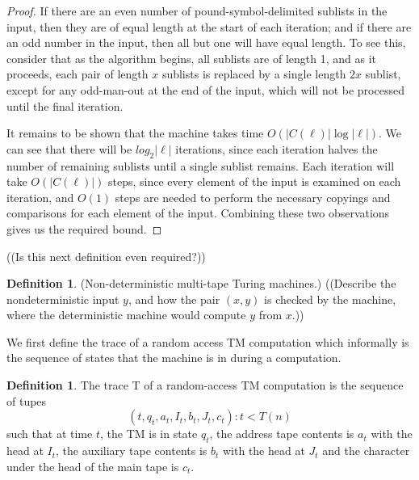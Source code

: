 \documentclass[english]{article}
\theoremstyle{plain}
\theoremstyle{definition}
\newtheorem{defn}[thm]{Definition}
\theoremstyle{plain}
\begin{document}
\begin{proof}
  If there are an even number of pound-symbol-delimited sublists in
  the input, then they are of equal length at the start of each
  iteration; and if there are an odd number in the input, then all but
  one will have equal length. To see this, consider that as the
  algorithm begins, all sublists are of length 1, and as it proceeds,
  each pair of length $x$ sublists is replaced by a single length $2x$
  sublist, except for any odd-man-out at the end of the input, which
  will not be processed until the final iteration.

  It remains to be shown that the machine takes time
  $O(|C(\ell)|\log|\ell|)$. We can see that there will be
  $log_2|\ell|$ iterations, since each iteration halves the number of
  remaining sublists until a single sublist remains. Each iteration
  will take $O(|C(\ell)|)$ steps, since every element of the input is
  examined on each iteration, and $O(1)$ steps are needed to perform
  the necessary copyings and comparisons for each element of the
  input. Combining these two observations gives us the required bound.


\end{proof}

((Is this next definition even required?))

\begin{defn}
  (Non-deterministic multi-tape Turing machines.) ((Describe the
  nondeterministic input $y$, and how the pair $(x,y)$ is checked by
  the machine, where the deterministic machine would compute $y$ from
  $x$.))
\end{defn}

We first define the trace of a random access TM computation which
informally is the sequence of states that the machine is in during a
computation.

\begin{defn}
  The trace T of a random-access TM computation is the sequence of tupes
\[
(t,q_t,a_t,I_t,b_t,J_t,c_t): t < T(n)
\]
  such that at time $t$, the TM is in state $q_t$, the address tape
  contents is $a_t$ with the head at $I_t$, the auxiliary tape
  contents is $b_t$ with the head at $J_t$ and the character under the
  head of the main tape is $c_t$.
\end{defn}
\end{document}
